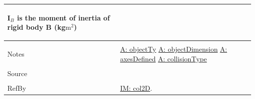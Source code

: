 \documentclass[12pt]{article}
\begin{document}
\begin{minipage}{\textwidth}
\begin{tabular}{p{} p{}}
\begin{symbDescription}
              \item{${\mathbf{I}_{B}}$ is the moment of inertia of rigid body B (kg$\text{m}^{2}$)}
              \end{symbDescription}
\\ \midrule \\
Notes & \hyperref[A:objectTy]{A: objectTy}
        \hyperref[A:objectDimension]{A: objectDimension}
        \hyperref[A:axesDefined]{A: axesDefined}
        \hyperref[A:collisionType]{A: collisionType}
\\ \midrule \\
Source & 
\\ \midrule \\
RefBy & \hyperref[IM:col2D]{IM: col2D}.
\\ \bottomrule \end{tabular}
\end{minipage}\\
~\newline
\end{document}
